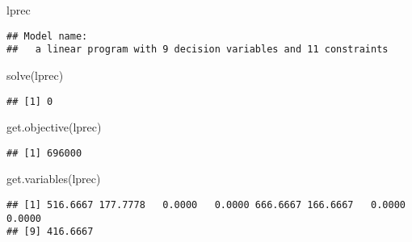 \documentclass[
]{article}
\newenvironment{Shaded}{\begin{snugshade}}{\end{snugshade}}
\newcommand{\FunctionTok}[1]{\textcolor[rgb]{0.00,0.00,0.00}{#1}}
\newcommand{\NormalTok}[1]{#1}
\begin{document}
\begin{Shaded}
\begin{Highlighting}[]
\NormalTok{lprec}
\end{Highlighting}
\end{Shaded}

\begin{verbatim}
## Model name: 
##   a linear program with 9 decision variables and 11 constraints
\end{verbatim}

\begin{Shaded}
\begin{Highlighting}[]
\FunctionTok{solve}\NormalTok{(lprec)}
\end{Highlighting}
\end{Shaded}

\begin{verbatim}
## [1] 0
\end{verbatim}

\begin{Shaded}
\begin{Highlighting}[]
\FunctionTok{get.objective}\NormalTok{(lprec)}
\end{Highlighting}
\end{Shaded}

\begin{verbatim}
## [1] 696000
\end{verbatim}

\begin{Shaded}
\begin{Highlighting}[]
\FunctionTok{get.variables}\NormalTok{(lprec)}
\end{Highlighting}
\end{Shaded}

\begin{verbatim}
## [1] 516.6667 177.7778   0.0000   0.0000 666.6667 166.6667   0.0000   0.0000
## [9] 416.6667
\end{verbatim}
\end{document}
